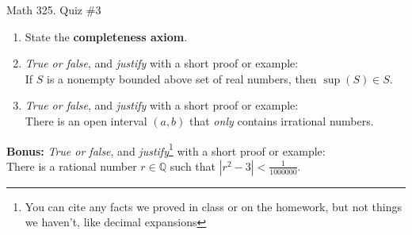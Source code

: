 \documentclass[12pt]{amsart}
\newcommand{\Q}{\mathbb{Q}}
\begin{document}
	
	\thispagestyle{empty}
	
	\begin{center}
		\Large{Math 325. Quiz \#3 }\\

	\end{center}
	
	
	
	\bigskip
	
	\begin{enumerate}
	
	\item State the \textbf{completeness axiom}.
	
	\vfill\vfill
	

\item  \emph{True or false}, and \emph{justify} with a short proof or example:\\
If $S$ is a nonempty bounded above set of real numbers, then $\sup(S) \in S$.

		
\vfill\vfill\vfill


\item  \emph{True or false}, and \emph{justify} with a short proof or example:\\
There is an open interval $(a,b)$ that \emph{only} contains irrational numbers.

\vfill\vfill\vfill 



\end{enumerate}

\newpage

\textbf{Bonus:} \emph{True or false}, and \emph{justify}\footnote{You can cite any facts we proved in class or on the homework, but not things we haven't, like decimal expansions} with a short proof or example:\\
There is a rational number $r\in \Q$ such that $\displaystyle |r^2 - 3| < \frac{1}{1000000}$.

	
	
\end{document}
